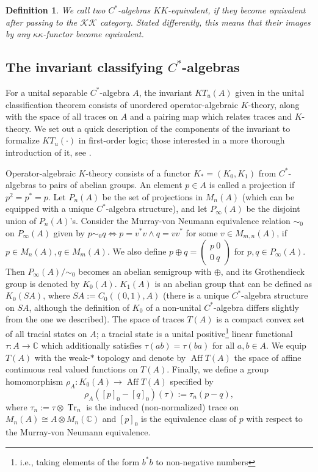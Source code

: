 \documentclass[12pt]{amsart}
\newtheorem{definition}[theorem]{Definition}
\DeclareMathOperator{\Aff}{Aff}
\begin{document}
\begin{definition} \label{definition: KK-equivalence}
    We call two $C^*$-algebras \textit{$KK$-equivalent}, if they become equivalent after passing to the $\mathcal{K}\mathcal{K}$ category. Stated differently, this means that their images by any $\kappa\kappa$-functor become equivalent.
\end{definition}

\subsection{The invariant classifying $C^*$-algebras}\label{subsec: invariant} 
For a unital separable $C^*$-algebra $A$, the invariant $KT_u(A)$ given in the unital classification theorem consists of unordered operator-algebraic $K$-theory, along with the space of all traces on $A$ and a pairing map which relates traces and $K$-theory. 
We set out a quick description of the components of the invariant to formalize $KT_u(\cdot)$ in first-order logic; those interested in a more thorough introduction of it, see \cite[\S 2.1]{CGSTW-new-classificationI-2023}. 


Operator-algebraic $K$-theory consists of a functor $K_* = (K_0, K_1)$ from $C^*$-algebras to pairs of abelian groups. 
An element $p \in A$ is called a projection if $p^2=p^*=p$. 
Let $P_{n}(A)$ be the set of projections in $M_n(A)$ (which can be equipped with a unique $C^*$-algebra structure), and let $P_{\infty}(A)$ be the disjoint union of $P_n(A)$'s. 
Consider the Murray-von Neumann equivalence relation $\sim_0$ on $P_{\infty}(A)$ given by $p \sim_0 q \iff p = v^*v \wedge q=vv^*$ for some $v \in M_{m, n}(A)$, if $p \in M_n(A), q \in M_m(A)$.
We also define 
$p \oplus q = \begin{pmatrix}
    p \ 0 \\
    0 \ q
\end{pmatrix}$ for $p,q \in P_{\infty}(A)$. 
Then $P_{\infty}(A)/\sim_0$ becomes an abelian semigroup with $\oplus$, and its Grothendieck group is denoted by $K_0(A)$.
$K_1(A)$ is an abelian group that can be defined as $K_0(SA)$, where $SA := C_0((0,1),A)$ (there is a unique $C^*$-algebra structure on $SA$, although the definition of $K_0$ of a non-unital $C^*$-algebra differs slightly from the one we described).
The space of traces $T(A)$ is a compact convex set of all tracial states on $A$; a tracial state is a unital positive\footnote{i.e., taking elements of the form $b^*b$ to non-negative numbers} linear functional $\tau \colon A \rightarrow \mathbb{C}$ which additionally satisfies $\tau(ab) = \tau(ba)$ for all $a,b \in A$. 
We equip $T(A)$ with the weak-$*$ topology and denote by $\Aff T(A)$ the space of affine continuous real valued functions on $T(A)$.
Finally, we define a group homomorphism $\rho_A \colon K_0(A) \rightarrow \Aff T(A)$ 
specified by
\[
    \rho_A([p]_0 - [q]_0) (\tau) := \tau_n(p-q),
\]
where $\tau_n := \tau \otimes \operatorname{Tr}_n$ is the induced (non-normalized) trace on $M_n(A) \cong A \otimes M_n(\mathbb{C})$ and $[p]_0$ is the equivalence class of $p$ with respect to the Murray-von Neumann equivalence.
\end{document}
